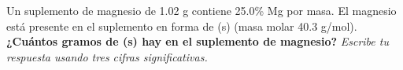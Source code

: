 Un suplemento de magnesio de 1.02 g contiene 25.0\% Mg por masa. El magnesio está presente en el suplemento en forma de (s) (masa molar 40.3 g/mol).
\textbf{¿Cuántos gramos de (s) hay en el suplemento de magnesio?}
\emph{Escribe tu respuesta usando tres cifras significativas.}